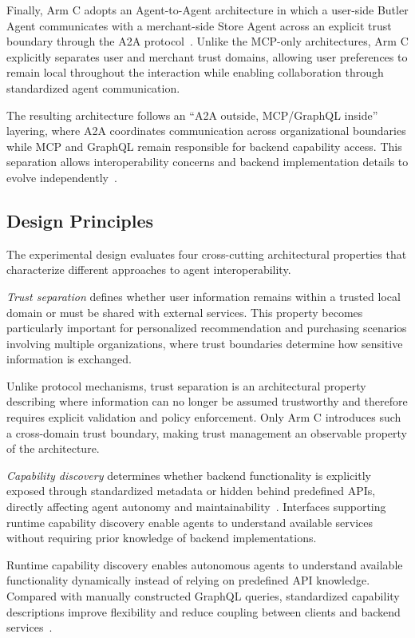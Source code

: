 \documentclass[conference]{IEEEtran}
\begin{document}
Finally, Arm C adopts an Agent-to-Agent architecture in which a user-side
Butler Agent communicates with a merchant-side Store Agent across an explicit
trust boundary through the A2A protocol~\cite{ref3}. Unlike the MCP-only
architectures, Arm C explicitly separates user and merchant trust domains,
allowing user preferences to remain local throughout the interaction while
enabling collaboration through standardized agent communication.

The resulting architecture follows an ``A2A outside, MCP/GraphQL inside''
layering, where A2A coordinates communication across organizational
boundaries while MCP and GraphQL remain responsible for backend capability
access. This separation allows interoperability concerns and backend
implementation details to evolve independently~\cite{ref3}.

\subsection{Design Principles}

The experimental design evaluates four cross-cutting architectural
properties that characterize different approaches to agent interoperability.

\emph{Trust separation} defines whether user information remains within a
trusted local domain or must be shared with external services. This property
becomes particularly important for personalized recommendation and
purchasing scenarios involving multiple organizations, where trust boundaries
determine how sensitive information is exchanged.

Unlike protocol mechanisms, trust separation is an architectural property
describing where information can no longer be assumed trustworthy and
therefore requires explicit validation and policy enforcement. Only Arm C
introduces such a cross-domain trust boundary, making trust management an
observable property of the architecture.

\emph{Capability discovery} determines whether backend functionality is
explicitly exposed through standardized metadata or hidden behind predefined
APIs, directly affecting agent autonomy and maintainability~\cite{ref2}.
Interfaces supporting runtime capability discovery enable agents to
understand available services without requiring prior knowledge of backend
implementations.

Runtime capability discovery enables autonomous agents to understand
available functionality dynamically instead of relying on predefined API
knowledge. Compared with manually constructed GraphQL queries, standardized
capability descriptions improve flexibility and reduce coupling between
clients and backend services~\cite{ref2}.
\end{document}

